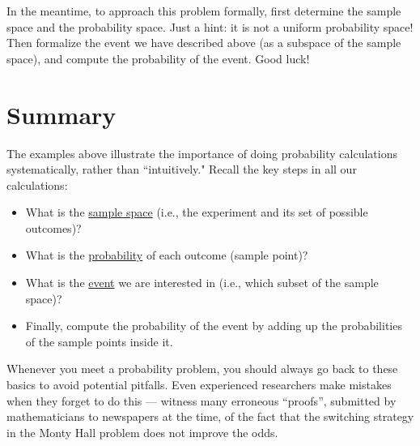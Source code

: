 \documentclass[11pt,fleqn]{article}
\begin{document}
In the meantime, to approach this problem formally, first determine the sample space
and the probability space. Just a hint: it is not a uniform probability space!
Then formalize the event we have described above (as a subspace
of the sample space), and compute
the probability of the event. Good luck!

\section*{Summary}
The examples above illustrate the importance
of doing probability calculations systematically, rather than
``intuitively."  Recall the key steps in all our calculations:
\begin{itemize}
\item What is the \underline{sample space} (i.e., the experiment and its set of
possible outcomes)?
\item What is the \underline{probability} of each outcome (sample point)?
\item What is the \underline{event} we are interested in (i.e., which subset
of the sample space)?
\item Finally, compute the probability of the event by adding up
the probabilities of the sample points inside it.
\end{itemize}
Whenever you meet a probability problem, you should always go back
to these basics to avoid potential pitfalls.  Even experienced
researchers make mistakes when they forget to do this --- witness
many erroneous ``proofs'', submitted by mathematicians to newspapers
at the time, of the fact that the switching strategy in the Monty
Hall problem does not improve the odds.
\end{document}
